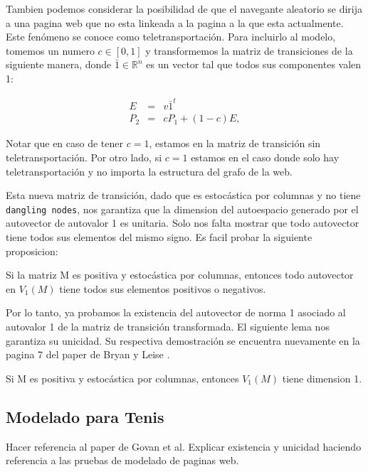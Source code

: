 Tambien podemos considerar la posibilidad de que el navegante aleatorio se dirija a una pagina web que no esta linkeada a la pagina a la que esta actualmente. Este fenómeno se conoce como teletransportación. Para incluirlo al modelo, tomemos un numero $c \in [0,1]$ y transformemos la matriz de transiciones de la siguiente manera, donde $\bar{1} \in \mathbb{R}^n$ es un vector tal que todos sus componentes valen 1:

\begin{eqnarray*}
E & = & v \bar{1}^t \\
P_2 & = & cP_1 + (1-c)E,
\end{eqnarray*}

Notar que en caso de tener $c=1$, estamos en la matriz de transición sin teletransportación. Por otro lado, si $c=1$ estamos en el caso donde solo hay teletransportación y no importa la estructura del grafo de la web.

Esta nueva matriz de transición, dado que es estocástica por columnas y no tiene \texttt{dangling nodes}, nos garantiza que la dimension del autoespacio generado por el autovector de autovalor 1 es unitaria. Solo nos falta mostrar que todo autovector tiene todos sus elementos del mismo signo. Es facil probar la siguiente proposicion:

\begin{proposition}
Si la matriz M es positiva y estocástica por columnas, entonces todo autovector en $V_1(M)$ tiene todos sus elementos positivos o negativos.
\end{proposition}

Por lo tanto, ya probamos la existencia del autovector de norma 1 asociado al autovalor 1 de la matriz de transición transformada. El siguiente lema nos garantiza su unicidad. Su respectiva demostración se encuentra nuevamente en la pagina 7 del paper de Bryan y Leise \cite{Bryan2006}.

\begin{lemma}
\item Si M es positiva y estocástica por columnas, entonces $V_1(M)$ tiene dimension 1.
\end{lemma}

\subsection{Modelado para Tenis}

Hacer referencia al paper de Govan et al. Explicar existencia y unicidad haciendo referencia a las pruebas de modelado de paginas web.

